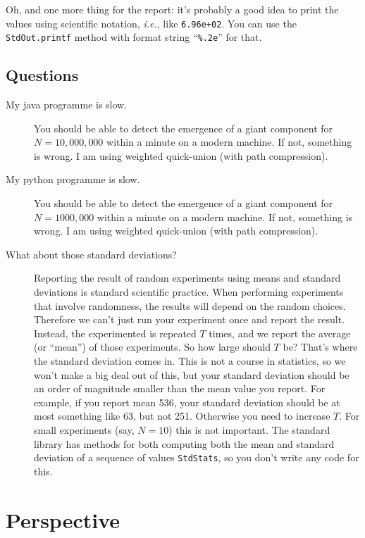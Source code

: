 \documentclass{tufte-handout}
\begin{document}
Oh, and one more thing for the report: it's probably a good idea to print the values
using scientific notation, \emph{i.e.}, like {\tt 6.96e+02}.
You can use the {\tt StdOut.printf} method with format string
``{\tt \%.2e}''  for that.

\subsection{Questions}
\begin{description}
\item[My java programme is slow.] You should be able to detect the emergence
  of a giant component for $N=10,000,000$ within a minute on a modern
  machine.
  If not, something is wrong.
  I am using weighted quick-union (with path compression).
\item[My python programme is slow.] You should be able to detect the emergence
  of a giant component for $N=1000,000$ within a minute on a modern
  machine.
  If not, something is wrong.
  I am using weighted quick-union (with path compression).
\item[What about those standard deviations?]
	Reporting the result of random experiments using means and standard deviations is standard scientific practice.
  When performing experiments that involve randomness,
  the results will depend on the random choices.
  Therefore we can't just run your experiment once and report the result.
  Instead, the experimented is repeated $T$ times, and we report the average
  (or ``mean'') of those experiments.
  So how large should $T$ be?
  That's where the standard deviation comes in.
  This is not a course in statistics, so we won't make a big deal out
  of this, but your standard deviation should be an order of magnitude
  smaller than the mean value you report.
  For example, if you report mean 536, your standard deviation should
  be at most something like 63, but not 251.
  Otherwise you need to increase $T$.
  For small experiments (say, $N=10$) this is not important.
  The standard library has methods for both computing both the mean and standard
  deviation of a sequence of values {\tt StdStats}, so you don't write any code for this.
\end{description}

\section{Perspective}
\end{document}
